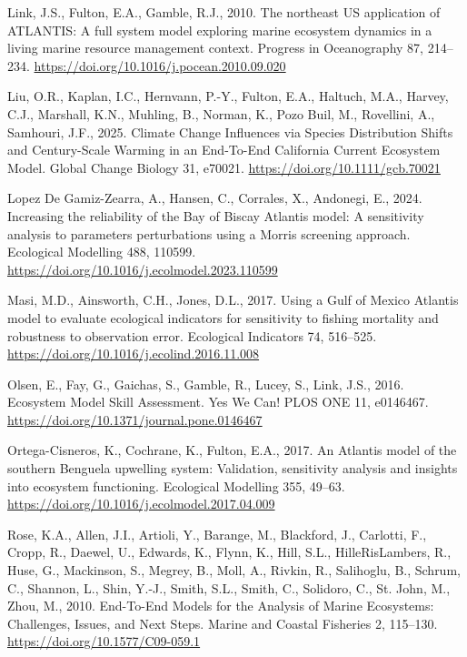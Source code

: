 \documentclass[
]{article}
\newlength{\cslhangindent}
\newenvironment{CSLReferences}[2] %
 {\begin{list}{}{%
  \setlength{\itemindent}{0pt}
  \setlength{\leftmargin}{0pt}
  \setlength{\parsep}{0pt}
  \ifodd #1
   \setlength{\leftmargin}{\cslhangindent}
   \setlength{\itemindent}{-1\cslhangindent}
  \fi
  \setlength{\itemsep}{#2\baselineskip}}}
 {\end{list}}
\begin{document}
\begin{CSLReferences}{1}{0}
Link, J.S., Fulton, E.A., Gamble, R.J., 2010. The northeast {US} application of {ATLANTIS}: {A} full system model exploring marine ecosystem dynamics in a living marine resource management context. Progress in Oceanography 87, 214--234. \url{https://doi.org/10.1016/j.pocean.2010.09.020}

Liu, O.R., Kaplan, I.C., Hernvann, P.-Y., Fulton, E.A., Haltuch, M.A., Harvey, C.J., Marshall, K.N., Muhling, B., Norman, K., Pozo Buil, M., Rovellini, A., Samhouri, J.F., 2025. Climate {Change Influences} via {Species Distribution Shifts} and {Century}-{Scale Warming} in an {End}-{To}-{End California Current Ecosystem Model}. Global Change Biology 31, e70021. \url{https://doi.org/10.1111/gcb.70021}

Lopez De Gamiz-Zearra, A., Hansen, C., Corrales, X., Andonegi, E., 2024. Increasing the reliability of the {Bay} of {Biscay Atlantis} model: {A} sensitivity analysis to parameters perturbations using a {Morris} screening approach. Ecological Modelling 488, 110599. \url{https://doi.org/10.1016/j.ecolmodel.2023.110599}

Masi, M.D., Ainsworth, C.H., Jones, D.L., 2017. Using a {Gulf} of {Mexico Atlantis} model to evaluate ecological indicators for sensitivity to fishing mortality and robustness to observation error. Ecological Indicators 74, 516--525. \url{https://doi.org/10.1016/j.ecolind.2016.11.008}

Olsen, E., Fay, G., Gaichas, S., Gamble, R., Lucey, S., Link, J.S., 2016. Ecosystem {Model Skill Assessment}. {Yes We Can}! PLOS ONE 11, e0146467. \url{https://doi.org/10.1371/journal.pone.0146467}

Ortega-Cisneros, K., Cochrane, K., Fulton, E.A., 2017. An {Atlantis} model of the southern {Benguela} upwelling system: {Validation}, sensitivity analysis and insights into ecosystem functioning. Ecological Modelling 355, 49--63. \url{https://doi.org/10.1016/j.ecolmodel.2017.04.009}

Rose, K.A., Allen, J.I., Artioli, Y., Barange, M., Blackford, J., Carlotti, F., Cropp, R., Daewel, U., Edwards, K., Flynn, K., Hill, S.L., HilleRisLambers, R., Huse, G., Mackinson, S., Megrey, B., Moll, A., Rivkin, R., Salihoglu, B., Schrum, C., Shannon, L., Shin, Y.-J., Smith, S.L., Smith, C., Solidoro, C., St. John, M., Zhou, M., 2010. End-{To-End Models} for the {Analysis} of {Marine Ecosystems}: {Challenges}, {Issues}, and {Next Steps}. Marine and Coastal Fisheries 2, 115--130. \url{https://doi.org/10.1577/C09-059.1}


\end{CSLReferences}
\end{document}
